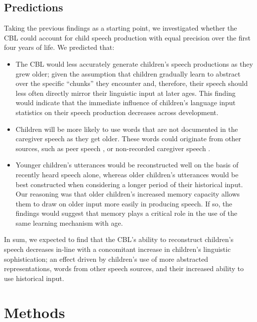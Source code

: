 \documentclass{article}
\begin{document}
\subsection{Predictions}
Taking the previous findings as a starting point, we investigated whether the CBL could account for child speech production with equal precision over the first four years of life. We predicted that:

\begin{itemize}
    \item The CBL would less accurately generate children's speech productions as they grew older; given the assumption that children gradually learn to abstract over the specific ``chunks'' they encounter \cite{bannard2009modeling, tomasello2003constructing, yang2016price} and, therefore, their speech should less often directly mirror their linguistic input at later ages. This finding would indicate that the immediate influence of children's language input statistics on their speech production decreases across development.
    \item Children will be more likely to use words that are not documented in the caregiver speech as they get older. These words could originate from other sources, such as peer speech \cite{hoff2010context, hoff1991older, mannle1992twoyearolds}, or non-recorded caregiver speech \cite{roy2009exploring}. 
    \item Younger children's utterances would be reconstructed well on the basis of recently heard speech alone, whereas older children's utterances would be best constructed when considering a longer period of their historical input. Our reasoning was that older children's increased memory capacity \cite{bauer2005developments, gathercole2004structure, wojcik2013remembering} allows them to draw on older input more easily in producing speech. If so, the findings would suggest that memory plays a critical role in the use of the same learning mechanism with age.
\end{itemize}

In sum, we expected to find that the CBL's ability to reconstruct children's speech decreases in-line with a concomitant increase in children's linguistic sophistication; an effect driven by children's use of more abstracted representations, words from other speech sources, and their increased ability to use historical input.

\section{Methods}
\end{document}
